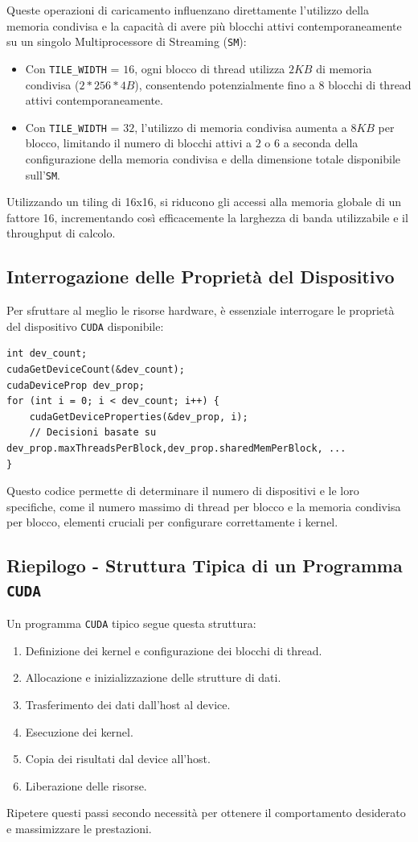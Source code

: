 Queste operazioni di caricamento influenzano direttamente l'utilizzo
della memoria condivisa e la capacità di avere più blocchi attivi
contemporaneamente su un singolo Multiprocessore di Streaming (\texttt{SM}):
\begin{itemize}
    \item Con \texttt{TILE\_WIDTH} = $16$, ogni blocco di thread utilizza
    $2KB$ di memoria condivisa ($2*256*4B$), consentendo potenzialmente
    fino a 8 blocchi di thread attivi contemporaneamente.
    \item Con \texttt{TILE\_WIDTH} = $32$, l'utilizzo di memoria condivisa
    aumenta a $8KB$ per blocco, limitando il numero di blocchi attivi a
    $2$ o $6$ a seconda della configurazione della memoria condivisa e
    della dimensione totale disponibile sull'\texttt{SM}.
\end{itemize}

Utilizzando un tiling di 16x16, si riducono gli accessi alla memoria
globale di un fattore 16, incrementando così efficacemente la larghezza
di banda utilizzabile e il throughput di calcolo.

\subsection{Interrogazione delle Proprietà del Dispositivo}
Per sfruttare al meglio le risorse hardware, è essenziale interrogare
le proprietà del dispositivo \texttt{CUDA} disponibile:
\begin{lstlisting}
int dev_count;
cudaGetDeviceCount(&dev_count);
cudaDeviceProp dev_prop;
for (int i = 0; i < dev_count; i++) {
    cudaGetDeviceProperties(&dev_prop, i);
    // Decisioni basate su dev_prop.maxThreadsPerBlock,dev_prop.sharedMemPerBlock, ...
}
\end{lstlisting}
Questo codice permette di determinare il numero di dispositivi e
le loro specifiche, come il numero massimo di thread per blocco e
la memoria condivisa per blocco, elementi cruciali per configurare
correttamente i kernel.

\subsection{Riepilogo - Struttura Tipica di un Programma \texttt{CUDA}}
Un programma \texttt{CUDA} tipico segue questa struttura:
\begin{enumerate}
    \item Definizione dei kernel e configurazione dei blocchi di thread.
    \item Allocazione e inizializzazione delle strutture di dati.
    \item Trasferimento dei dati dall'host al device.
    \item Esecuzione dei kernel.
    \item Copia dei risultati dal device all'host.
    \item Liberazione delle risorse.
\end{enumerate}
Ripetere questi passi secondo necessità per ottenere il comportamento
desiderato e massimizzare le prestazioni.
